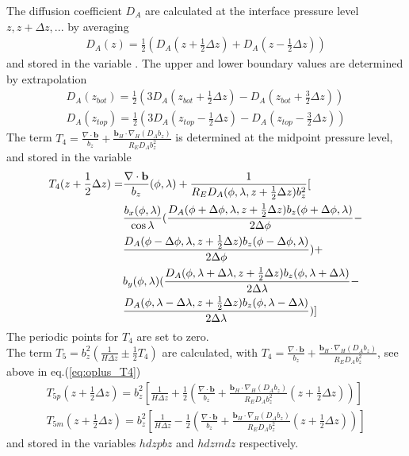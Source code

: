 %
The diffusion coefficient $D_A$ are calculated at the interface
pressure level $z, z+ \Delta z, ...$ by averaging
%
\begin{align}
  D_A (z) = \frac{1}{2} \left( D_A(z+\frac{1}{2}\Delta z) + D_A(z-\frac{1}{2}\Delta z)\right)
  \label{eq:oplus_daint}
\end{align}
%
and stored in the variable . The upper and lower boundary
values are determined by extrapolation
%
\begin{align}
  D_A (z_{bot}) = \frac{1}{2} \left( 3 D_A(z_{bot}+\frac{1}{2}\Delta z) - D_A(z_{bot}+\frac{3}{2}\Delta
  z)\right) \\
  D_A (z_{top}) = \frac{1}{2} \left( 3 D_A(z_{top}-\frac{1}{2}\Delta z) - D_A(z_{top}-\frac{3}{2}\Delta z)\right)
\end{align}
%
The term $T_4 = \frac{\nabla \cdot \mathbf{b}}{b_z} +
\frac{\mathbf{b}_H \cdot \nabla_H (D_A b_z)}{R_E D_A b_z^2}$ is
determined at the midpoint pressure level, and stored in the
variable 
%
\begin{align}
  T_4(z+\frac{1}{2}\Delta z) = & \frac{\nabla \cdot \mathbf{b}}{b_z}(\phi,\lambda) +
  \frac{1}{R_E D_A(\phi,\lambda,z+\frac{1}{2}\Delta z) b_z^2}[
  \notag \\
  {} & \frac{b_x(\phi,\lambda)}{\cos \lambda} (\frac{D_A(\phi+\Delta \phi,\lambda,z+\frac{1}{2}\Delta z)
  b_z(\phi+\Delta \phi,\lambda)}{2 \Delta \phi} - \notag \\
  {} & \frac{D_A(\phi-\Delta \phi,\lambda,z+\frac{1}{2}\Delta z)
  b_z(\phi-\Delta \phi,\lambda)}{2 \Delta \phi})+ \notag \\
  {} & b_y(\phi,\lambda) (\frac{D_A(\phi,\lambda+\Delta \lambda,z+\frac{1}{2}\Delta z)
  b_z(\phi,\lambda+\Delta \lambda)}{2 \Delta \lambda} - \notag \\
  {} & \frac{D_A(\phi,\lambda-\Delta \lambda,z+\frac{1}{2}\Delta z)
  b_z(\phi,\lambda-\Delta \lambda)}{2 \Delta \lambda})] \label{eq:oplus_T4}
\end{align}
%
The periodic points for $T_4$ are set to zero. \\

%
The term $T_5= b_z^2(\frac{1}{H \Delta z} \pm \frac{1}{2}T_4)$ are
calculated, with $T_4 = \frac{\nabla \cdot \mathbf{b}}{b_z} +
\frac{\mathbf{b}_H \cdot \nabla_H (D_A b_z)}{R_E D_A b_z^2} $, see
above in eq.(\ref{eq:oplus_T4})
%
\begin{align}
  T_{5p}(z+\frac{1}{2}\Delta z) = b_z^2\left[ \frac{1}{H \Delta z} +
    \frac{1}{2} \left( \frac{\nabla \cdot \mathbf{b}}{b_z} +
     \frac{\mathbf{b}_H \cdot \nabla_H (D_A b_z)}{R_E D_A b_z^2}(z+\frac{1}{2}\Delta z)\right)
     \right] \label{eq:oplus_T_5p}\\
  T_{5m}(z+\frac{1}{2}\Delta z) = b_z^2\left[ \frac{1}{H \Delta z} -
    \frac{1}{2} \left( \frac{\nabla \cdot \mathbf{b}}{b_z} +
     \frac{\mathbf{b}_H \cdot \nabla_H (D_A b_z)}{R_E D_A b_z^2}(z+\frac{1}{2}\Delta z)\right)
     \right]  \label{eq:oplus_T_5m}
\end{align}
%
and stored in the variables $hdzpbz$ and $hdzmdz$ respectively. \\

